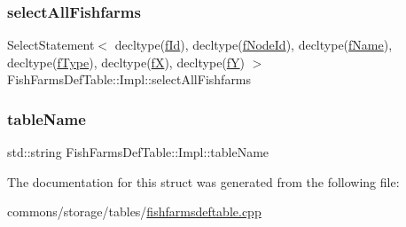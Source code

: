 \subsubsection{\texorpdfstring{selectAllFishfarms}{selectAllFishfarms}}
{\footnotesize\ttfamily Select\+Statement$<$ decltype(\mbox{\hyperlink{struct_fish_farms_def_table_1_1_impl_ae3eeaefb826965d54a6ebf27696a67c0}{f\+Id}}), decltype(\mbox{\hyperlink{struct_fish_farms_def_table_1_1_impl_acc9e1ce4f57803601bbf172bb6499207}{f\+Node\+Id}}), decltype(\mbox{\hyperlink{struct_fish_farms_def_table_1_1_impl_ad8cb7e9d96f8c73c705563c9c4537b1e}{f\+Name}}), decltype(\mbox{\hyperlink{struct_fish_farms_def_table_1_1_impl_a25df08564e817f991ab732f2e84af021}{f\+Type}}), decltype(\mbox{\hyperlink{struct_fish_farms_def_table_1_1_impl_a74ecffa210908377879c244444116dab}{fX}}), decltype(\mbox{\hyperlink{struct_fish_farms_def_table_1_1_impl_a7922671ffef246d44ed2c9fb4efd719d}{fY}}) $>$ Fish\+Farms\+Def\+Table\+::\+Impl\+::select\+All\+Fishfarms}

\mbox{\label{struct_fish_farms_def_table_1_1_impl_a96002972a7a89dfbc26a22b81477f426}} 
\subsubsection{\texorpdfstring{tableName}{tableName}}
{\footnotesize\ttfamily std\+::string Fish\+Farms\+Def\+Table\+::\+Impl\+::table\+Name}



The documentation for this struct was generated from the following file\+:\begin{DoxyCompactItemize}
\item 
commons/storage/tables/\mbox{\hyperlink{fishfarmsdeftable_8cpp}{fishfarmsdeftable.\+cpp}}\end{DoxyCompactItemize}

